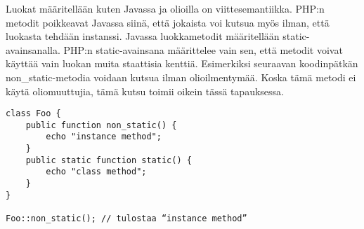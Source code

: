 Luokat määritellään kuten Javassa ja  olioilla on viittesemantiikka. PHP:n metodit poikkeavat Javassa siinä, että jokaista voi kutsua myös ilman, että luokasta tehdään instanssi. Javassa luokkametodit määritellään static-avainsanalla. PHP:n static-avainsana määrittelee vain sen, että metodit voivat käyttää vain luokan muita staattisia kenttiä. Esimerkiksi seuraavan koodinpätkän non\_static-metodia voidaan kutsua ilman olioilmentymää. Koska tämä metodi ei käytä oliomuuttujia, tämä kutsu toimii oikein tässä tapauksessa. 

\lstset{language=PHP,
	basicstyle=\ttfamily,
	breaklines=true,
	columns=fullflexible}
\begin{lstlisting}
class Foo {
    public function non_static() {
        echo "instance method";
    }
    public static function static() {
        echo "class method";
    }
}

Foo::non_static(); // tulostaa “instance method”
\end{lstlisting}